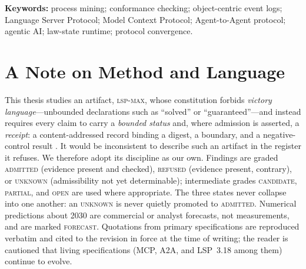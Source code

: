 \documentclass[11pt,a4paper,oneside]{report}
\theoremstyle{plain}
\theoremstyle{definition}
\theoremstyle{remark}
\newcommand{\stat}[1]{\textsc{#1}}
\newcommand{\admitted}{\textcolor{admitted}{\stat{admitted}}}
\def\refused{\textcolor{refused}{\stat{refused}}}
\newcommand{\unknownstat}{\textcolor{unknown}{\stat{unknown}}}
\newcommand{\candidate}{\stat{candidate}}
\newcommand{\partialstat}{\stat{partial}}
\newcommand{\openstat}{\stat{open}}
\newcommand{\forecast}{\textcolor{refused}{\stat{forecast}}}
\newcommand{\lspmax}{\mbox{\textsc{lsp-max}}}
\begin{document}
\vfill
\noindent\textbf{Keywords:} process mining; conformance checking; object-centric
event logs; Language Server Protocol; Model Context Protocol; Agent-to-Agent
protocol; agentic AI; law-state runtime; protocol convergence.

\chapter*{A Note on Method and Language}

This thesis studies an artifact, \lspmax, whose constitution forbids
\emph{victory language}---unbounded declarations such as ``solved'' or
``g{u}aranteed''---and instead requires every claim to carry a \emph{bounded
status} and, where admission is asserted, a \emph{receipt}: a content-addressed
record binding a digest, a boundary, and a negative-control result
\citep{lspmax}. It would be inconsistent to describe such an artifact in the
register it refuses. We therefore adopt its discipline as our own. Findings are
graded \admitted{} (evidence present and checked), \refused{} (evidence present,
contrary), or \unknownstat{} (admissibility not yet determinable); intermediate
grades \candidate, \partialstat, and \openstat{} are used where appropriate. The
three states never collapse into one another: an \unknownstat{} is never quietly
promoted to \admitted. Numerical predictions about 2030 are commercial or
analyst forecasts, not measurements, and are marked \forecast. Quotations from
primary specifications are reproduced verbatim and cited to the revision in force
at the time of writing; the reader is cautioned that living specifications
(MCP, A2A, and LSP~3.18 among them) continue to evolve.

\cleardoublepage
\tableofcontents
\listoffigures
\listoftables
\end{document}
